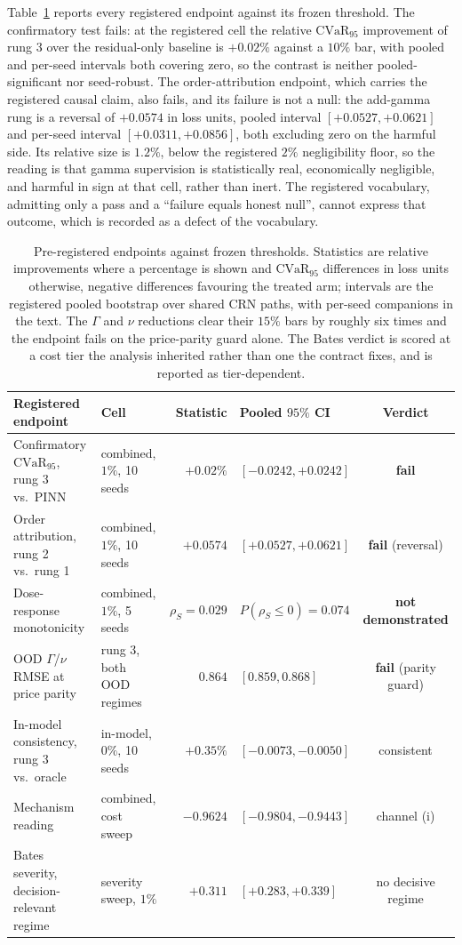 \documentclass{article}
\begin{document}
Table~\ref{tab:verdicts} reports every registered endpoint against its frozen
threshold. The confirmatory test fails: at the registered cell the relative
$\mathrm{CVaR}_{95}$ improvement of rung 3 over the residual-only baseline is $+0.02\%$
against a $10\%$ bar, with pooled and per-seed intervals both covering zero, so the
contrast is neither pooled-significant nor seed-robust. The order-attribution
endpoint, which carries the registered causal claim, also fails, and its failure is
not a null: the add-gamma rung is a reversal of $+0.0574$ in loss units, pooled
interval $[+0.0527, +0.0621]$ and per-seed interval $[+0.0311, +0.0856]$, both
excluding zero on the harmful side. Its relative size is $1.2\%$, below the
registered $2\%$ negligibility floor, so the reading is that gamma supervision is
statistically real, economically negligible, and harmful in sign at that cell,
rather than inert. The registered vocabulary, admitting only a pass and a
``failure equals honest null'', cannot express that outcome, which is recorded as a
defect of the vocabulary.

\begin{table}[!htbp]
\caption{Pre-registered endpoints against frozen thresholds. Statistics are
relative improvements where a percentage is shown and $\mathrm{CVaR}_{95}$
differences in loss units otherwise, negative differences favouring the treated
arm; intervals are the registered pooled bootstrap over shared CRN paths, with
per-seed companions in the text. The $\Gamma$ and $\nu$ reductions clear their
$15\%$ bars by roughly six times and the endpoint fails on the price-parity guard
alone. The Bates verdict is scored at a cost tier the analysis inherited rather
than one the contract fixes, and is reported as tier-dependent.}
\label{tab:verdicts}
\centering\footnotesize\setlength{\tabcolsep}{3.5pt}
\begin{tabular}{@{}llrlc@{}}
\toprule
Registered endpoint & Cell & Statistic & Pooled $95\%$ CI & Verdict \\
\midrule
Confirmatory $\mathrm{CVaR}_{95}$, rung 3 vs.\ PINN & combined, $1\%$, 10 seeds & $+0.02\%$ & $[-0.0242,+0.0242]$ & \textbf{fail} \\
Order attribution, rung 2 vs.\ rung 1 & combined, $1\%$, 10 seeds & $+0.0574$ & $[+0.0527,+0.0621]$ & \textbf{fail} (reversal) \\
Dose-response monotonicity & combined, $1\%$, 5 seeds & $\rho_S=0.029$ & $P(\rho_S\le0)=0.074$ & \textbf{not demonstrated} \\
OOD $\Gamma$/$\nu$ RMSE at price parity & rung 3, both OOD regimes & $0.864$ & $[0.859,0.868]$ & \textbf{fail} (parity guard) \\
In-model consistency, rung 3 vs.\ oracle & in-model, $0\%$, 10 seeds & $+0.35\%$ & $[-0.0073,-0.0050]$ & consistent \\
Mechanism reading & combined, cost sweep & $-0.9624$ & $[-0.9804,-0.9443]$ & channel (i) \\
Bates severity, decision-relevant regime & severity sweep, $1\%$ & $+0.311$ & $[+0.283,+0.339]$ & no decisive regime \\
\bottomrule
\end{tabular}
\end{table}
\end{document}
